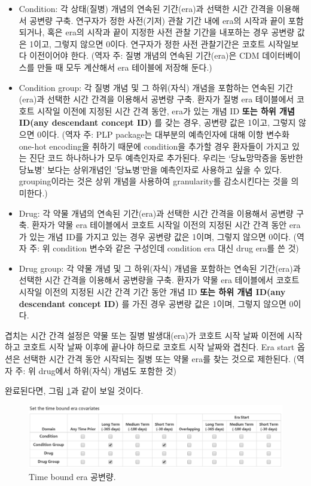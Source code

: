 \documentclass[10.5pt]{book}
\providecommand{\tightlist}{%
  \setlength{\itemsep}{0pt}\setlength{\parskip}{0pt}}
\theoremstyle{definition}
\theoremstyle{definition}
\theoremstyle{definition}
\theoremstyle{remark}
\begin{document}
\begin{itemize}
\tightlist
\item
  Condition: 각 상태(질병) 개념의 연속된 기간(era)과 선택한 시간 간격을
  이용해서 공변량 구축. 연구자가 정한 사전(기저) 관찰 기간 내에 era의
  시작과 끝이 포함되거나, 혹은 era의 시작과 끝이 지정한 사전 관찰 기간을
  내포하는 경우 공변량 값은 1이고, 그렇지 않으면 0이다. 연구자가 정한
  사전 관찰기간은 코호트 시작일보다 이전이어야 한다. (역자 주: 질병
  개념의 연속된 기간(era)은 CDM 데이터베이스를 만들 때 모두 계산해서 era
  테이블에 저장해 둔다.)
\item
  Condition group: 각 질병 개념 및 그 하위(자식) 개념을 포함하는 연속된
  기간 (era)과 선택한 시간 간격을 이용해서 공변량 구축. 환자가 질병 era
  테이블에서 코호트 시작일 이전에 지정된 시간 간격 동안, era가 있는 개념
  ID \textbf{또는 하위 개념 ID(any descendant concept ID)} 를 갖는 경우,
  공변량 값은 1이고, 그렇지 않으면 0이다. (역자 주: PLP package는
  대부분의 예측인자에 대해 이항 변수화 one-hot encoding을 취하기 때문에
  condition을 추가할 경우 환자들이 가지고 있는 진단 코드 하나하나가 모두
  예측인자로 추가된다. 우리는 `당뇨망막증을 동반한 당뇨병' 보다는
  상위개념인 '당뇨병'만을 예측인자로 사용하고 싶을 수 있다.
  grouping이라는 것은 상위 개념을 사용하여 granularity를 감소시킨다는
  것을 의미한다.)
\item
  Drug: 각 약물 개념의 연속된 기간(era)과 선택한 시간 간격을 이용해서
  공변량 구축. 환자가 약물 era 테이블에서 코호트 시작일 이전의 지정된
  시간 간격 동안 era가 있는 개념 ID를 가지고 있는 경우 공변량 값은
  1이며, 그렇지 않으면 0이다. (역자 주: 위 condition 변수와 같은
  구성인데 condition era 대신 drug era를 쓴 것)
\item
  Drug group: 각 약물 개념 및 그 하위(자식) 개념을 포함하는 연속된
  기간(era)과 선택한 시간 간격을 이용해서 공변량을 구축. 환자가 약물 era
  테이블에서 코호트 시작일 이전의 지정된 시간 간격 기간 동안 개념 ID
  \textbf{또는 하위 개념 ID(any descendant concept ID)} 를 가진 경우
  공변량 값은 1이며, 그렇지 않으면 0이다.
\end{itemize}

겹치는 시간 간격 설정은 약물 또는 질병 발생대(era)가 코호트 시작 날짜
이전에 시작하고 코호트 시작 날짜 이후에 끝나야 하므로 코호트 시작 날짜와
겹친다. Era start 옵션은 선택한 시간 간격 동안 시작되는 질병 또는 약물
era를 찾는 것으로 제한된다. (역자 주: 위 drug에서 하위(자식) 개념도
포함한 것)

완료된다면, 그림 \ref{fig:covariateSettings4}과 같이 보일 것이다.

\begin{figure}

{\centering \includegraphics[width=1\linewidth]{images/PatientLevelPrediction/covariateSettings4} 

}

\caption{Time bound era 공변량.}\label{fig:covariateSettings4}
\end{figure}
\end{document}
